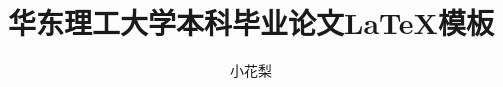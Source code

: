 \documentclass{ecustthesis}
\title{华东理工大学本科毕业论文\LaTeX{}模板}
\author{小花梨}
\begin{document}
    
    \tableofcontents
    
    
    
    
    
    \bibsection
    
    
\end{document}
